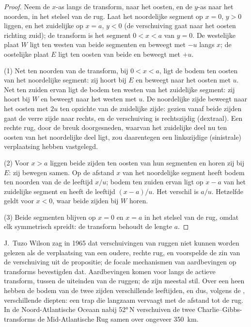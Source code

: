 \begin{proof}
Neem de $x$-as langs de transform, naar het oosten, en de $y$-as naar het noorden, in het stelsel van de rug. Laat het noordelijke segment op $x = 0$, $y > 0$ liggen, en het zuidelijke op $x = a$, $y < 0$ (de verschuiving gaat naar het oosten richting zuid); de transform is het segment $0 < x < a$ van $y = 0$. De westelijke plaat $W$ ligt ten westen van beide segmenten en beweegt met $-u$ langs $x$; de oostelijke plaat $E$ ligt ten oosten van beide en beweegt met $+u$.

(1) Net ten noorden van de transform, bij $0 < x < a$, ligt de bodem ten oosten van het noordelijke segment: zij hoort bij $E$ en beweegt naar het oosten met $u$. Net ten zuiden ervan ligt de bodem ten westen van het zuidelijke segment: zij hoort bij $W$ en beweegt naar het westen met $u$. De noordelijke zijde beweegt naar het oosten met $2u$ ten opzichte van de zuidelijke zijde: gezien vanaf beide zijden gaat de verre zijde naar rechts, en de verschuiving is rechtszijdig (dextraal). Een rechte rug, door de breuk doorgesneden, waarvan het zuidelijke deel nu ten oosten van het noordelijke deel ligt, zou daarentegen een linkszijdige (sinistrale) verplaatsing hebben vastgelegd.

(2) Voor $x > a$ liggen beide zijden ten oosten van hun segmenten en horen zij bij $E$: zij bewegen samen. Op de afstand $x$ van het noordelijke segment heeft bodem ten noorden van de  de leeftijd $x/u$; bodem ten zuiden ervan ligt op $x - a$ van het zuidelijke segment en heeft de leeftijd $(x - a)/u$. Het verschil is $a/u$. Hetzelfde geldt voor $x < 0$, waar beide zijden bij $W$ horen.

(3) Beide segmenten blijven op $x = 0$ en $x = a$ in het stelsel van de rug, omdat elk symmetrisch spreidt: de transform behoudt de lengte $a$.
\end{proof}

J.\ Tuzo Wilson zag in 1965 dat verschuivingen van ruggen niet kunnen worden gelezen als de verplaatsing van een oudere, rechte rug, en voorspelde de zin van de verschuiving uit de propositie; de focale mechanismen van aardbevingen op transforms bevestigden dat. Aardbevingen komen voor langs de actieve transform, tussen de uiteinden van de ruggen; de  zijn meestal stil. Over een  heen hebben de bodem van de twee zijden verschillende leeftijden, en dus, volgens de , verschillende diepten: een trap die langzaam vervaagt met de afstand tot de rug. In de Noord-Atlantische Oceaan nabij \ang{52}\,N verschuiven de twee Charlie--Gibbs-transforms de Mid-Atlantische Rug samen over ongeveer \qty{350}{km}.

